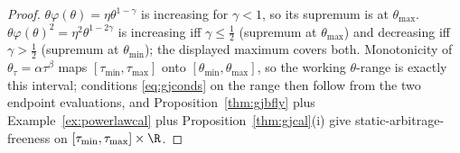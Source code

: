 \begin{proof}
$\theta\varphi(\theta)=\eta\theta^{1-\gamma}$ is increasing for $\gamma<1$, so its supremum is
at $\theta_{\max}$. $\theta\varphi(\theta)^2=\eta^2\theta^{1-2\gamma}$ is increasing iff
$\gamma\le\tfrac12$ (supremum at $\theta_{\max}$) and decreasing iff $\gamma>\tfrac12$
(supremum at $\theta_{\min}$); the displayed maximum covers both. Monotonicity of
$\theta_\tau=\alpha\tau^\beta$ maps $[\tau_{\min},\tau_{\max}]$ onto
$[\theta_{\min},\theta_{\max}]$, so the working $\theta$-range is exactly this interval;
conditions \eqref{eq:gjconds} on the range then follow from the two endpoint evaluations, and
Proposition~\ref{thm:gjbfly} plus Example~\ref{ex:powerlawcal} plus Proposition~\ref{thm:gjcal}(i)
give static-arbitrage-freeness on $[\tau_{\min},\tau_{\max}]\times\R$.
\end{proof}



\newpage

